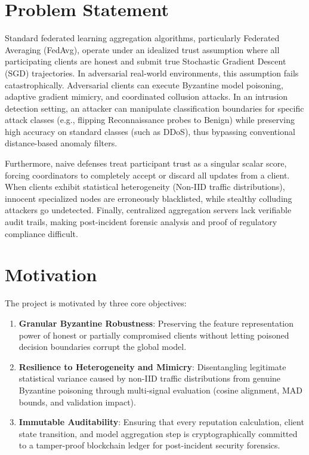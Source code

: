 \documentclass[12pt,a4paper]{report}
\begin{document}
\section{Problem Statement}
Standard federated learning aggregation algorithms, particularly Federated Averaging (FedAvg), operate under an idealized trust assumption where all participating clients are honest and submit true Stochastic Gradient Descent (SGD) trajectories. In adversarial real-world environments, this assumption fails catastrophically. Adversarial clients can execute Byzantine model poisoning, adaptive gradient mimicry, and coordinated collusion attacks. In an intrusion detection setting, an attacker can manipulate classification boundaries for specific attack classes (e.g., flipping Reconnaissance probes to Benign) while preserving high accuracy on standard classes (such as DDoS), thus bypassing conventional distance-based anomaly filters. 

Furthermore, naive defenses treat participant trust as a singular scalar score, forcing coordinators to completely accept or discard all updates from a client. When clients exhibit statistical heterogeneity (Non-IID traffic distributions), innocent specialized nodes are erroneously blacklisted, while stealthy colluding attackers go undetected. Finally, centralized aggregation servers lack verifiable audit trails, making post-incident forensic analysis and proof of regulatory compliance difficult.

\section{Motivation}
The project is motivated by three core objectives:
\begin{enumerate}
    \item \textbf{Granular Byzantine Robustness}: Preserving the feature representation power of honest or partially compromised clients without letting poisoned decision boundaries corrupt the global model.
    \item \textbf{Resilience to Heterogeneity and Mimicry}: Disentangling legitimate statistical variance caused by non-IID traffic distributions from genuine Byzantine poisoning through multi-signal evaluation (cosine alignment, MAD bounds, and validation impact).
    \item \textbf{Immutable Auditability}: Ensuring that every reputation calculation, client state transition, and model aggregation step is cryptographically committed to a tamper-proof blockchain ledger for post-incident security forensics.
\end{enumerate}
\end{document}
